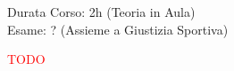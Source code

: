 \documentclass[../uefaC.tex]{subfiles}
\begin{document}
\onlyinsubfile{\maketitle}

\onlyinsubfile{}

\onlyinsubfile{\tableofcontents}


Durata Corso: 2h (Teoria in Aula) \hfill \\
Esame: ? (Assieme a Giustizia Sportiva)

\textcolor{red}{TODO}
\end{document}
